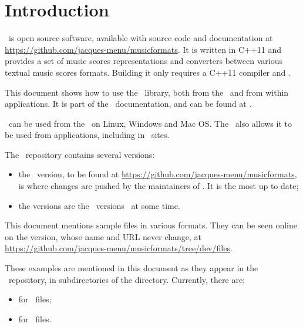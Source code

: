 
\chapter{Introduction}

\mf\ is open source software, available with source code and documentation at \url{https://github.com/jacques-menu/musicformats}. It is written in C++11 and provides a set of music scores representations and converters between various textual music scores formats. Building it only requires a C++11 compiler and \cmake.

This document shows how to use the \mf\ library, both from the \CLI\ and from within applications. It is part of the \mf\ documentation, and can be found at .

\mf\ can be used from the \CLI\ on Linux, Windows and Mac OS. The \API\ also allows it to be used from applications, including in \Web\ sites.

The \mf\ repository contains several versions:
\begin{itemize}
\item the  \master\ version, to be found at \url{https://github.com/jacques-menu/musicformats}, is where changes are pushed by the maintainers of \mf. It is the most up to date;
\item the  versions are the \master\ versions \frozen\ at some time.
\end{itemize}

This document mentions sample files in various formats. They can be seen online on the  version, whose name and URL never change, at \url{https://github.com/jacques-menu/musicformats/tree/dev/files}.

These examples are mentioned in this document as they appear in the \mf\ repository, in subdirectories of the  directory. Currently, there are:
\begin{itemize}
\item {} for \mxml\ files;
\item {} for \msdlLang\ files.
\end{itemize}

